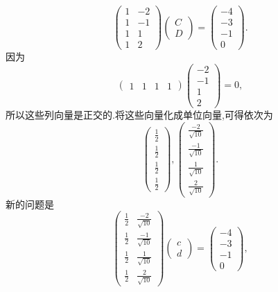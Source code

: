 ﻿\documentclass{book} \usepackage{exsheets} \usepackage{xeCJK}
\begin{document}
\begin{solution}
$$
  \begin{pmatrix}
 1&-2\\
 1&-1\\
 1&1\\
 1&2   
  \end{pmatrix}
  \begin{pmatrix}
    C\\
D
  \end{pmatrix}=
  \begin{pmatrix}
    -4\\
    -3\\
    -1\\
    0
  \end{pmatrix}.
$$
因为
$$
\begin{pmatrix}
  1&1&1&1
\end{pmatrix}
\begin{pmatrix}
  -2\\
-1\\
1\\
2
\end{pmatrix}=0,
$$
所以这些列向量是正交的.将这些向量化成单位向量,可得依次为
$$
\begin{pmatrix}
  \frac{1}{2}\\
\frac{1}{2}\\
\frac{1}{2}\\
\frac{1}{2}
\end{pmatrix},
\begin{pmatrix}
  \frac{-2}{\sqrt{10}}\\
\frac{-1}{\sqrt{10}}\\
\frac{1}{\sqrt{10}}\\
\frac{2}{\sqrt{10}}
\end{pmatrix}.
$$
新的问题是
$$
\begin{pmatrix}
  \frac{1}{2}&\frac{-2}{\sqrt{10}}\\
  \frac{1}{2}&\frac{-1}{\sqrt{10}}\\
  \frac{1}{2}&\frac{1}{\sqrt{10}}\\
  \frac{1}{2}&\frac{2}{\sqrt{10}}
\end{pmatrix}
\begin{pmatrix}
  c\\
d
\end{pmatrix}=
\begin{pmatrix}
  -4\\
-3\\
-1\\
0
\end{pmatrix},
$$
\end{solution}
\end{document}
